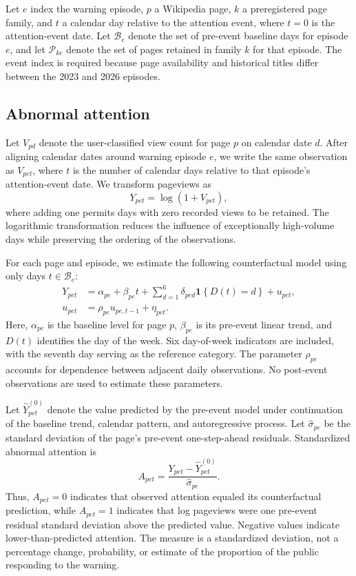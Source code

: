 \elsevierclasstrue\documentclass[preprint,12pt]{elsarticle}%
\begin{document}
Let $e$ index the warning episode, $p$ a Wikipedia page, $k$ a preregistered page family, and $t$ a calendar day relative to the attention event, where $t=0$ is the attention-event date. Let $\mathcal{B}_e$ denote the set of pre-event baseline days for episode $e$, and let $\mathcal{P}_{ke}$ denote the set of pages retained in family $k$ for that episode. The event index is required because page availability and historical titles differ between the 2023 and 2026 episodes.

\subsection{Abnormal attention}

Let $V_{pd}$ denote the user-classified view count for page $p$ on calendar date $d$. After aligning calendar dates around warning episode $e$, we write the same observation as $V_{pet}$, where $t$ is the number of calendar days relative to that episode's attention-event date.
We transform pageviews as
\begin{equation}
Y_{pet}=\log\!\left(1+V_{pet}\right),
\label{eq:logviews}
\end{equation}
where adding one permits days with zero recorded views to be retained. The logarithmic transformation reduces the influence of exceptionally high-volume days while preserving the ordering of the observations.

For each page and episode, we estimate the following counterfactual model using only days $t\in\mathcal{B}_e$:
\begin{align}
Y_{pet}
  &= \alpha_{pe}+\beta_{pe}t
     +\sum_{d=1}^{6}\delta_{ped}
       \mathbf{1}\!\left\{D(t)=d\right\}
     +u_{pet},
\label{eq:attentionmodel}\\
u_{pet}
  &= \rho_{pe}u_{pe,t-1}+\eta_{pet}.
\label{eq:attentionar}
\end{align}
Here, $\alpha_{pe}$ is the baseline level for page $p$, $\beta_{pe}$ is its pre-event linear trend, and $D(t)$ identifies the day of the week. Six day-of-week indicators are included, with the seventh day serving as the reference category. The parameter $\rho_{pe}$ accounts for dependence between adjacent daily observations. No post-event observations are used to estimate these parameters.

Let $\widehat{Y}_{pet}^{(0)}$ denote the value predicted by the pre-event model under continuation of the baseline trend, calendar pattern, and autoregressive process. Let $\widehat{\sigma}_{pe}$ be the standard deviation of the page's pre-event one-step-ahead residuals. Standardized abnormal attention is
\begin{equation}
A_{pet}
  =\frac{Y_{pet}-\widehat{Y}_{pet}^{(0)}}{\widehat{\sigma}_{pe}}.
\label{eq:abnormalattention}
\end{equation}
Thus, $A_{pet}=0$ indicates that observed attention equaled its counterfactual prediction, while $A_{pet}=1$ indicates that log pageviews were one pre-event residual standard deviation above the predicted value. Negative values indicate lower-than-predicted attention. The measure is a standardized deviation, not a percentage change, probability, or estimate of the proportion of the public responding to the warning.
\end{document}
